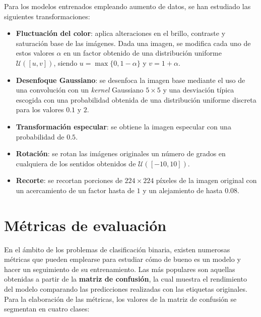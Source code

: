 Para los modelos entrenados empleando aumento de datos, se han estudiado las siguientes
transformaciones:

\begin{itemize}
	\item \textbf{Fluctuación del color}: aplica alteraciones en el brillo,
	contraste y saturación base de las imágenes. Dada una imagen, se modifica
	cada uno de estos valores $\alpha$ en un factor obtenido de una distribución
	uniforme $\mathcal{U}([u, v])$, siendo $u = \max\{0, 1 - \alpha\}$ y $v = 1 +
	\alpha$.
	
	\item \textbf{Desenfoque Gaussiano}: se desenfoca la imagen base mediante el uso
	de una convolución con un \textit{kernel} Gaussiano $5 \times 5$ y una
	desviación típica escogida con una probabilidad obtenida de una distribución
	uniforme discreta para los valores $0.1$ y $2$.
	
	\item \textbf{Transformación especular}: se obtiene la imagen especular con una
	probabilidad de $0.5$.
	
	\item \textbf{Rotación}: se rotan las imágenes originales un número de grados en
	cualquiera de los sentidos obtenidos de $\mathcal{U}([-10,10])$.
	
	\item \textbf{Recorte}: se recortan porciones de $224 \times 224$ píxeles de la
	imagen original con un acercamiento de un factor hasta de $1$ y un alejamiento
	de hasta $0.08$.
\end{itemize}

\section{Métricas de evaluación}

En el ámbito de los problemas de clasificación binaria, existen numerosas
métricas que pueden emplearse para estudiar cómo de bueno es un modelo y hacer
un seguimiento de su entrenamiento. Las más populares son aquellas obtenidas a partir
de la \textbf{matriz de confusión}, la cual muestra el rendimiento del modelo comparando
las predicciones realizadas con las etiquetas originales. Para la elaboración de
las métricas, los valores de la matriz de confusión se segmentan en cuatro clases:

